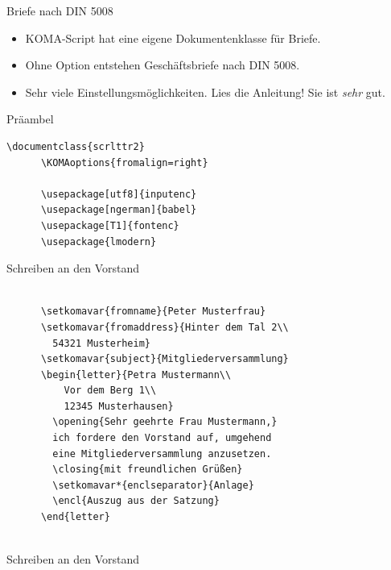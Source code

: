 \begin{Frame}[fragile]{Briefe nach DIN 5008}
  \begin{itemize}
    \item KOMA-Script hat eine eigene Dokumentenklasse für Briefe.
    \item Ohne Option entstehen Geschäftsbriefe nach DIN 5008.
    \item Sehr viele Einstellungsmöglichkeiten. \newline
      \alert{Lies die Anleitung!} Sie ist \emph{sehr} gut.
  \end{itemize}

  \xxx

  \begin{Block}{Präambel}
    \begin{lstlisting}[style=block,gobble=6]
      \documentclass{scrlttr2}
      \KOMAoptions{fromalign=right}

      \usepackage[utf8]{inputenc}
      \usepackage[ngerman]{babel}
      \usepackage[T1]{fontenc}
      \usepackage{lmodern}
     \end{lstlisting}
  \end{Block}
\end{Frame}

\begin{Frame}[fragile]{Schreiben an den Vorstand}
  \begin{lstlisting}[gobble=4]
    
      \setkomavar{fromname}{Peter Musterfrau}
      \setkomavar{fromaddress}{Hinter dem Tal 2\\
        54321 Musterheim}
      \setkomavar{subject}{Mitgliederversammlung}
      \begin{letter}{Petra Mustermann\\
          Vor dem Berg 1\\
          12345 Musterhausen}
        \opening{Sehr geehrte Frau Mustermann,}
        ich fordere den Vorstand auf, umgehend
        eine Mitgliederversammlung anzusetzen.
        \closing{mit freundlichen Grüßen}
        \setkomavar*{enclseparator}{Anlage}
        \encl{Auszug aus der Satzung}
      \end{letter}
    
  \end{lstlisting}
\end{Frame}

\begin{frame}[t]{Schreiben an den Vorstand}
\end{frame}

